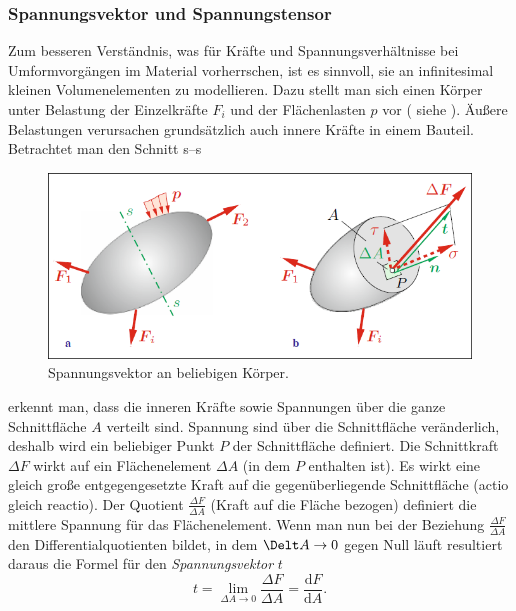\documentclass[12pt,a4paper,parskip,twoside,BCOR5mm,headsepline]{scrartcl}
\begin{document}
\begin{description*}
\begin{itemize*}
\subsubsection{Spannungsvektor und Spannungstensor}
Zum besseren Verständnis,  was für Kräfte und Spannungsverhältnisse bei Umformvorgängen im Material vorherrschen,  ist es sinnvoll,  sie an infinitesimal kleinen Volumenelementen zu modellieren. Dazu stellt man sich einen Körper unter Belastung der Einzelkräfte $ F_i $ und der Flächenlasten $ p $  vor ( siehe ). Äußere Belastungen verursachen grundsätzlich auch innere Kräfte in einem Bauteil. Betrachtet man den Schnitt s--s \begin{figure}
  \centering
  \includegraphics[width=.8\textwidth]{normalvektor}
  \caption[Spannungsvektor am Körper]{Spannungsvektor an beliebigen Körper. \autocite[43]{tmr}}
  \label{fig:normalvektor}
  \end{figure}
 erkennt man,  dass die inneren Kräfte sowie Spannungen über die ganze Schnittfläche $ A $ verteilt sind. Spannung sind über die Schnittfläche veränderlich,  deshalb  wird ein beliebiger Punkt $ P $ der Schnittfläche definiert. Die Schnittkraft $ \Delta F $  wirkt auf ein Flächenelement $ \Delta A $ (in dem $ P $ enthalten ist). Es wirkt eine gleich große entgegengesetzte Kraft auf die gegenüberliegende Schnittfläche (actio gleich reactio). Der Quotient $ \frac{\Delta F}{\Delta A} $ (Kraft auf die Fläche bezogen) definiert die mittlere Spannung für das Flächenelement. Wenn man nun bei der Beziehung $ \frac{\Delta F}{\Delta A} $ den Differentialquotienten bildet,  in dem $ \Delt A \rightarrow 0 $ gegen Null läuft  resultiert daraus die Formel für den \emph{Spannungsvektor }$ t $ \begin{equation}
   t = \lim \limits_{\Delta A \to 0} \frac{\Delta F}{\Delta A} = \frac{\text{d}F}{\text{d}A}  
   .\end{equation}

\end{itemize*}
\end{description*}
\end{document}
